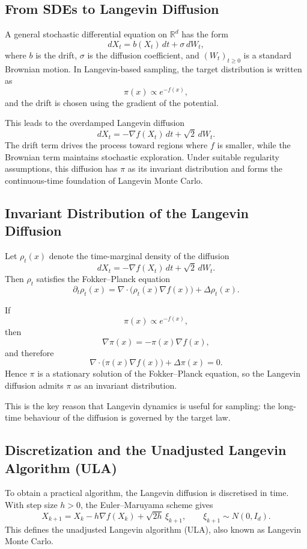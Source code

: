 \documentclass[a4paper,11pt, titlepage]{article}
\theoremstyle{definition}
\theoremstyle{plain}
\theoremstyle{remark}
\begin{document}
\subsection{From SDEs to Langevin Diffusion}

A general stochastic differential equation on $\mathbb{R}^d$ has the form
\[
dX_t=b(X_t)\,dt+\sigma\,dW_t,
\]
where $b$ is the drift, $\sigma$ is the diffusion coefficient, and $(W_t)_{t\geq 0}$ is a standard Brownian motion. In Langevin-based sampling, the target distribution is written as
\[
\pi(x)\propto e^{-f(x)},
\]
and the drift is chosen using the gradient of the potential.

This leads to the overdamped Langevin diffusion
\[
dX_t=-\nabla f(X_t)\,dt+\sqrt{2}\,dW_t.
\]
The drift term drives the process toward regions where $f$ is smaller, while the Brownian term maintains stochastic exploration. Under suitable regularity assumptions, this diffusion has $\pi$ as its invariant distribution and forms the continuous-time foundation of Langevin Monte Carlo.


\subsection{Invariant Distribution of the Langevin Diffusion}

Let $\rho_t(x)$ denote the time-marginal density of the diffusion
\[
dX_t=-\nabla f(X_t)\,dt+\sqrt{2}\,dW_t.
\]
Then $\rho_t$ satisfies the Fokker--Planck equation
\[
\partial_t \rho_t(x)
=
\nabla\cdot\bigl(\rho_t(x)\nabla f(x)\bigr)+\Delta \rho_t(x).
\]

If
\[
\pi(x)\propto e^{-f(x)},
\]
then
\[
\nabla \pi(x)=-\pi(x)\nabla f(x),
\]
and therefore
\[
\nabla\cdot\bigl(\pi(x)\nabla f(x)\bigr)+\Delta \pi(x)=0.
\]
Hence $\pi$ is a stationary solution of the Fokker--Planck equation, so the Langevin diffusion admits $\pi$ as an invariant distribution.

This is the key reason that Langevin dynamics is useful for sampling: the long-time behaviour of the diffusion is governed by the target law.

\subsection{Discretization and the Unadjusted Langevin Algorithm (ULA)}

To obtain a practical algorithm, the Langevin diffusion is discretised in time. With step size $h>0$, the Euler--Maruyama scheme gives
\[
X_{k+1}=X_k-h\nabla f(X_k)+\sqrt{2h}\,\xi_{k+1},
\qquad
\xi_{k+1}\sim N(0,I_d).
\]
This defines the unadjusted Langevin algorithm (ULA), also known as Langevin Monte Carlo.
\end{document}
